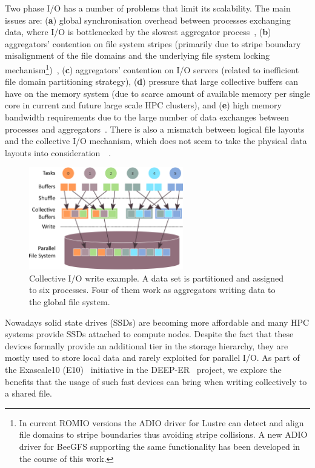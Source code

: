 Two phase I/O has a number of problems that limit its scalability. The main issues are: (\textbf{a}) global synchronisation overhead between processes exchanging data, where I/O is bottlenecked by the slowest aggregator process~\cite{WeikuanV08}, (\textbf{b}) aggregators' contention on file system stripes (primarily due to stripe boundary misalignment of the file domains and the underlying file system locking mechanism\footnote{In current ROMIO versions the ADIO driver for Lustre can detect and align file domains to stripe boundaries thus avoiding stripe collisions. A new ADIO driver for BeeGFS supporting the same functionality has been developed in the course of this work.})~\cite{LiaoA08}, (\textbf{c}) aggregators' contention on I/O servers (related to inefficient file domain partitioning strategy), (\textbf{d}) pressure that large collective buffers can have on the memory system (due to scarce amount of available memory per single core in current and future large scale HPC clusters), and (\textbf{e}) high memory bandwidth requirements due to the large number of data exchanges between processes and aggregators~\cite{YinYTY12}. There is also a mismatch between logical file layouts and the collective I/O mechanism, which does not seem to take the physical data layouts into consideration~\cite{YongXTRG11}~\cite{XuechenJD09}.
\begin{figure}[!htb]
  \centering
  \includegraphics[width=0.6\textwidth]{chapters/chapter3/figures/coll-io}
  \caption{Collective I/O write example. A data set is partitioned and assigned to six processes. Four of them work as aggregators writing data to the global file system.}
  \label{figure: coll_io}
\end{figure}

Nowadays solid state drives (SSDs) are becoming more affordable and many HPC systems provide SSDs attached to compute nodes. Despite the fact that these devices formally provide an additional tier in the storage hierarchy, they are mostly used to store local data and rarely exploited for parallel I/O. As part of the Exascale10 (E10)~\cite{e10} initiative in the DEEP-ER~\cite{deep-er} project, we explore the benefits that the usage of such fast devices can bring when writing collectively to a shared file.

